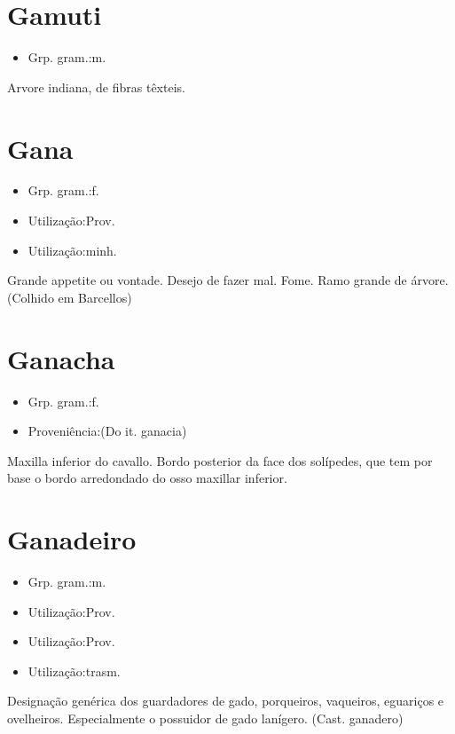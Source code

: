 \section{Gamuti}
\begin{itemize}
\item {Grp. gram.:m.}
\end{itemize}
Arvore indiana, de fibras têxteis.
\section{Gana}
\begin{itemize}
\item {Grp. gram.:f.}
\end{itemize}
\begin{itemize}
\item {Utilização:Prov.}
\end{itemize}
\begin{itemize}
\item {Utilização:minh.}
\end{itemize}
Grande appetite ou vontade.
Desejo de fazer mal.
Fome.
Ramo grande de árvore. (Colhido em Barcellos)
\section{Ganacha}
\begin{itemize}
\item {Grp. gram.:f.}
\end{itemize}
\begin{itemize}
\item {Proveniência:(Do it. \textunderscore ganacia\textunderscore )}
\end{itemize}
Maxilla inferior do cavallo.
Bordo posterior da face dos solípedes, que tem por base o bordo arredondado do osso maxillar inferior.
\section{Ganadeiro}
\begin{itemize}
\item {Grp. gram.:m.}
\end{itemize}
\begin{itemize}
\item {Utilização:Prov.}
\end{itemize}
\begin{itemize}
\item {Utilização:Prov.}
\end{itemize}
\begin{itemize}
\item {Utilização:trasm.}
\end{itemize}
Designação genérica dos guardadores de gado, porqueiros, vaqueiros, eguariços e ovelheiros.
Especialmente o possuidor de gado lanígero.
(Cast. \textunderscore ganadero\textunderscore )
